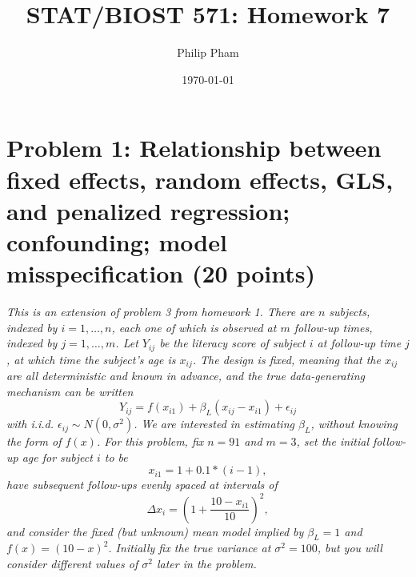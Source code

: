 \documentclass[11pt, letterpaper]{article}
\title{STAT/BIOST 571: Homework 7}
\author{Philip Pham}
\date{\today}
\begin{document}
\maketitle

\section*{Problem 1: Relationship between fixed effects, random effects, GLS, and penalized regression; confounding; model misspecification (20 points)} 

{\em This is an extension of problem  3 from homework 1.  There are $n$ subjects, indexed by $i=1,\ldots,n$, each one of which is observed at
$m$ follow-up times, indexed by $j=1,\ldots,m$.  Let $Y_{ij}$ be the literacy score of subject $i$ at follow-up time $j$, at which time the subject's age is $x_{ij}$.  
The design is fixed, meaning that the $x_{ij}$ are all
deterministic and known in advance, and the true data-generating
mechanism can be written
\[
Y_{ij}=f(x_{i1})+\beta_L(x_{ij}-x_{i1})+\epsilon_{ij}
\]
with i.i.d. $\epsilon_{ij}\sim N(0,\sigma^2)$.  We are interested in estimating $\beta_L$,
without knowing the form of $f(x)$.
For this problem, fix $n=91$ and $m=3$, set 
the initial follow-up age for subject $i$ to be 
\[
x_{i1}=1+0.1*(i-1),
\]
have subsequent follow-ups evenly spaced at intervals of 
\[
\Delta x_i = \left(1 + \frac{10-x_{i1}}{10}\right)^2,
\]
and consider the fixed (but unknown) mean model implied by $\beta_L=1$ and  $f(x) = (10-x)^2$.
Initially fix the true variance at $\sigma^2 = 100$, but you will consider different values of $\sigma^2$ later in the problem. }
\end{document}
